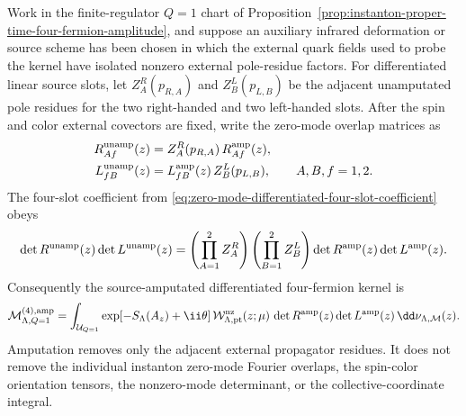 \begin{proposition}
\label{prop:instanton-external-leg-amputation-kernel}
Work in the finite-regulator \(Q=1\) chart of
Proposition~\ref{prop:instanton-proper-time-four-fermion-amplitude}, and
suppose an auxiliary infrared deformation or source scheme has been chosen in
which the external quark fields used to probe the kernel have isolated
nonzero external pole-residue factors.  For differentiated linear source
slots, let \(Z^R_A(p_{R,A})\) and \(Z^L_B(p_{L,B})\) be the adjacent
unamputated pole residues for the two right-handed and two left-handed slots.
After the spin and color external covectors are fixed, write the zero-mode
overlap matrices as
\begin{equation}
\begin{aligned}
  R^{\rm unamp}_{Af}(z)
  &=
  Z^R_A(p_{R,A})\,R^{\rm amp}_{Af}(z),\\
  L^{\rm unamp}_{fB}(z)
  &=
  L^{\rm amp}_{fB}(z)\,Z^L_B(p_{L,B}),
  \qquad A,B,f=1,2 .
\end{aligned}
  \label{eq:instanton-amputated-linear-source-matrices}
\end{equation}
The four-slot coefficient from
\eqref{eq:zero-mode-differentiated-four-slot-coefficient} obeys
\begin{equation}
  \det R^{\rm unamp}(z)\det L^{\rm unamp}(z)
  =
  \left(\prod_{A=1}^{2}Z^R_A\right)
  \left(\prod_{B=1}^{2}Z^L_B\right)
  \det R^{\rm amp}(z)\det L^{\rm amp}(z).
  \label{eq:instanton-source-determinant-amputation}
\end{equation}
Consequently the source-amputated differentiated four-fermion kernel is
\begin{equation}
  \mathcal M^{(4),{\rm amp}}_{\Lambda,Q=1}
  =
  \int_{\mathcal U_{Q=1}}
  \exp[-S_\Lambda(A_z)+\ii\theta]\,
  \mathcal W_{\Lambda,{\rm pt}}^{\rm nz}(z;\mu)\,
  \det R^{\rm amp}(z)\det L^{\rm amp}(z)\,
  \dd\nu_{\Lambda,\mathcal M}(z).
  \label{eq:instanton-amputated-four-fermion-kernel}
\end{equation}
Amputation removes only the adjacent external propagator residues.  It does
not remove the individual instanton zero-mode Fourier overlaps, the spin-color
orientation tensors, the nonzero-mode determinant, or the
collective-coordinate integral.


\end{proposition}
